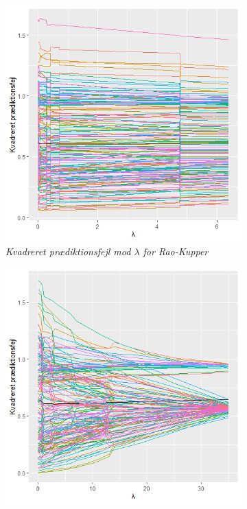 \documentclass[11pt,a4paper]{article}
\begin{document}
\begin{figure}[h!]
  \centering
  \begin{subfigure}[b]{0.45\textwidth}
    \includegraphics[width=\textwidth]{MSPESTATISK1.png}
    \caption{\textit{Kvadreret prædiktionsfejl mod $\lambda$ for Rao-Kupper}}
    \label{fig:MSPEStat}
  \end{subfigure}
    \hspace{0.2cm}
  \begin{subfigure}[b]{0.45\linewidth}
    \includegraphics[width=\textwidth]{MSPELINEALPHA.png}

\end{subfigure}
\end{figure}
\end{document}
